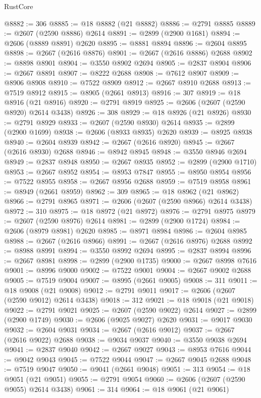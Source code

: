\begin{lexlean}{RustCore}
\begin{coremodule}
@8882 := 306
@8885 := @18 @8882 (@21 @8882)
@8886 := @2791 @8885
@8889 := @2607 (@2590 @8886) @2614
@8891 := @2899 (@2900 @1681)
@8894 := @2606 (@8889 @8891) @2620
@8895 := @8881 @8894
@8896 := @2604 @8895
@8898 := @2667 (@2616 @8876)
@8901 := @2667 (@2616 @8886) @2688
@8902 := @8898 @8901
@8904 := @3550 @8902 @2694
@8905 := @2837 @8904
@8906 := @2667 @8891
@8907 := @8222 @2688
@8908 := @7612 @8907
@8909 := @8906 @8908
@8910 := @7522 @8909
@8912 := @2667 @8910 @2688
@8913 := @7519 @8912
@8915 := @8905 (@2661 @8913)
@8916 := 307
@8919 := @18 @8916 (@21 @8916)
@8920 := @2791 @8919
@8925 := @2606 (@2607 (@2590 @8920) @2614 @3438)
@8926 := 308
@8929 := @18 @8926 (@21 @8926)
@8930 := @2791 @8929
@8933 := @2607 (@2590 @8930) @2614
@8935 := @2899 (@2900 @1699)
@8938 := @2606 (@8933 @8935) @2620
@8939 := @8925 @8938
@8940 := @2604 @8939
@8942 := @2667 (@2616 @8920)
@8945 := @2667 (@2616 @8930) @2688
@8946 := @8942 @8945
@8948 := @3550 @8946 @2694
@8949 := @2837 @8948
@8950 := @2667 @8935
@8952 := @2899 (@2900 @1710)
@8953 := @2667 @8952
@8954 := @8953 @7847
@8955 := @8950 @8954
@8956 := @7522 @8955
@8958 := @2667 @8956 @2688
@8959 := @7519 @8958
@8961 := @8949 (@2661 @8959)
@8962 := 309
@8965 := @18 @8962 (@21 @8962)
@8966 := @2791 @8965
@8971 := @2606 (@2607 (@2590 @8966) @2614 @3438)
@8972 := 310
@8975 := @18 @8972 (@21 @8972)
@8976 := @2791 @8975
@8979 := @2607 (@2590 @8976) @2614
@8981 := @2899 (@2900 @1724)
@8984 := @2606 (@8979 @8981) @2620
@8985 := @8971 @8984
@8986 := @2604 @8985
@8988 := @2667 (@2616 @8966)
@8991 := @2667 (@2616 @8976) @2688
@8992 := @8988 @8991
@8994 := @3550 @8992 @2694
@8995 := @2837 @8994
@8996 := @2667 @8981
@8998 := @2899 (@2900 @1735)
@9000 := @2667 @8998 @7616
@9001 := @8996 @9000
@9002 := @7522 @9001
@9004 := @2667 @9002 @2688
@9005 := @7519 @9004
@9007 := @8995 (@2661 @9005)
@9008 := 311
@9011 := @18 @9008 (@21 @9008)
@9012 := @2791 @9011
@9017 := @2606 (@2607 (@2590 @9012) @2614 @3438)
@9018 := 312
@9021 := @18 @9018 (@21 @9018)
@9022 := @2791 @9021
@9025 := @2607 (@2590 @9022) @2614
@9027 := @2899 (@2900 @1749)
@9030 := @2606 (@9025 @9027) @2620
@9031 := @9017 @9030
@9032 := @2604 @9031
@9034 := @2667 (@2616 @9012)
@9037 := @2667 (@2616 @9022) @2688
@9038 := @9034 @9037
@9040 := @3550 @9038 @2694
@9041 := @2837 @9040
@9042 := @2667 @9027
@9043 := @8953 @7616
@9044 := @9042 @9043
@9045 := @7522 @9044
@9047 := @2667 @9045 @2688
@9048 := @7519 @9047
@9050 := @9041 (@2661 @9048)
@9051 := 313
@9054 := @18 @9051 (@21 @9051)
@9055 := @2791 @9054
@9060 := @2606 (@2607 (@2590 @9055) @2614 @3438)
@9061 := 314
@9064 := @18 @9061 (@21 @9061)

\end{coremodule}
\end{lexlean}

